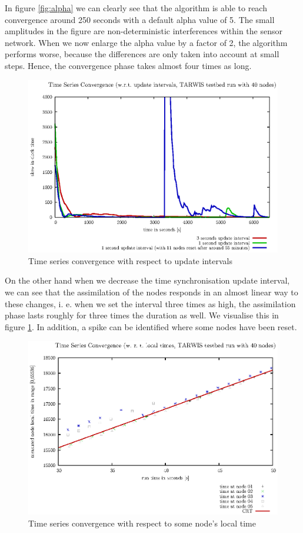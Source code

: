\documentclass{llncs}
\begin{document}
	\noindent In figure \ref{fig:alpha} we can clearly see that the algorithm is able to reach convergence around 250 seconds with a default alpha value of 5. The small amplitudes in the figure are non-deterministic interferences within the sensor network. When we now enlarge the alpha value by a factor of 2, the algorithm performs worse, because the differences are only taken into account at small steps. Hence, the convergence phase takes almost four times as long.\\
	\begin{figure}[H]
		\centering
		\includegraphics[scale=0.6]{images/FIG_02.eps}
		\caption{Time series convergence with respect to update intervals}
		\label{fig:update_intervals}
	\end{figure}
	\noindent On the other hand when we decrease the time synchronisation update interval, we can see that the assimilation of the nodes responds in an almost linear way to these changes, i. e. when we set the interval three times as high, the assimilation phase lasts roughly for three times the duration as well. We visualise this in figure \ref{fig:update_intervals}. In addition, a spike can be identified where some nodes have been reset.\\
	
	\begin{figure}[H]
		\centering
		\includegraphics[scale=0.6]{images/FIG_03.eps}
		\caption{Time series convergence with respect to some node's local time}
		\label{fig:local_time}
	\end{figure}
	
\end{document}
